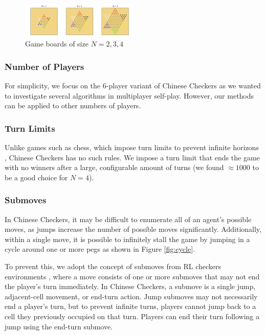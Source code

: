\documentclass[12pt, a4paper, twocolumn]{article}
\begin{document}
\begin{figure}
  \centering
    \includegraphics[width=0.5\textwidth]{images/boards.png}
  \caption{Game boards of size $N = 2, 3, 4$}
  \label{fig:boards}
\end{figure}

\subsubsection{Number of Players}

For simplicity, we focus on the 6-player variant of Chinese Checkers as we wanted to investigate several algorithms in multiplayer self-play. However, our methods can be applied to other numbers of players.

\subsubsection{Turn Limits}

Unlike games such as chess, which impose turn limits to prevent infinite horizons \cite{ChessTurnLimit}, Chinese Checkers has no such rules. We impose a turn limit that ends the game with no winners after a large, configurable amount of turns (we found $\approx 1000$ to be a good choice for $N=4$).

\subsubsection{Submoves}

In Chinese Checkers, it may be difficult to enumerate all of an agent's possible moves, as jumps increase the number of possible moves significantly. Additionally, within a single move, it is possible to infinitely stall the game by jumping in a cycle around one or more pegs as shown in Figure \ref{fig:cycle}.

To prevent this, we adopt the concept of submoves from RL checkers environments \cite{RLCheckers}, where a move consists of one or more submoves that may not end the player's turn immediately. In Chinese Checkers, a submove is a single jump, adjacent-cell movement, or end-turn action. Jump submoves may not necessarily end a player's turn, but to prevent infinite turns, players cannot jump back to a cell they previously occupied on that turn. Players can end their turn following a jump using the end-turn submove.
\end{document}
